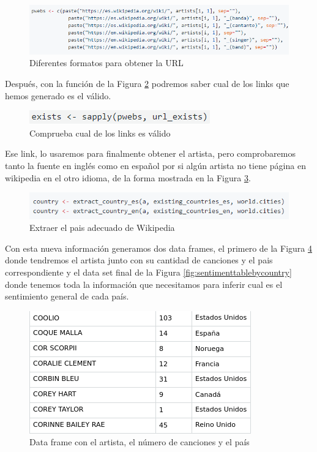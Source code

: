 \begin{figure}[h]
	\centering
	\includegraphics[width=0.7\linewidth]{Imagenes/artists-wikipedia}
	\caption{Diferentes formatos para obtener la URL}
	\label{fig:artists-wikipedia}
\end{figure}

Después, con la función de la Figura \ref{fig:link-exists} podremos saber cual de los links que hemos generado es el válido. 

\begin{figure}[h]
	\centering
	\includegraphics[width=0.7\linewidth]{Imagenes/link-exists}
	\caption{Comprueba cual de los links es válido}
	\label{fig:link-exists}
\end{figure}

Ese link, lo usaremos para finalmente obtener el artista, pero comprobaremos tanto la fuente en inglés como en español por si algún artista no tiene página en wikipedia en el otro idioma, de la forma mostrada en la Figura \ref{fig:asignar-oais}.

\begin{figure}[h]
	\centering
	\includegraphics[width=0.7\linewidth]{Imagenes/asignar-oais}
	\caption{Extraer el pais adecuado de Wikipedia}
	\label{fig:asignar-oais}
\end{figure}

Con esta nueva información generamos dos data frames, el primero de la Figura \ref{fig:artistcountry} donde tendremos el artista junto con su cantidad de canciones y el pais correspondiente y el data set final de la Figura \ref{fig:sentimenttablebycountry} donde tenemos toda la información que necesitamos para inferir cual es el sentimiento general de cada país.

\begin{figure}[h]
	\centering
	\includegraphics[width=0.7\linewidth]{Imagenes/artistcountry}
	\caption{Data frame con el artista, el número de canciones y el país}
	\label{fig:artistcountry}
\end{figure}

